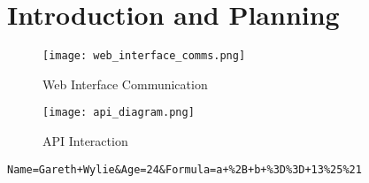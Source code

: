 \section{Introduction and Planning}

\begin{figure}[!htb]
\begin{center}
\texttt{[image: web\_interface\_comms.png]}
\end{center}
\caption{Web Interface Communication}
\label{fig:web-interface-communication}
\end{figure}

\begin{figure}[!htb]
\begin{center}
\texttt{[image: api\_diagram.png]}
\end{center}
\caption{API Interaction}
\label{fig:api-interaction}
\end{figure}

\renewcommand{\lstlistingname}{Code}
\begin{lstlisting}[caption=blabla, label=amb]
Name=Gareth+Wylie&Age=24&Formula=a+%2B+b+%3D%3D+13%25%21
\end{lstlisting}